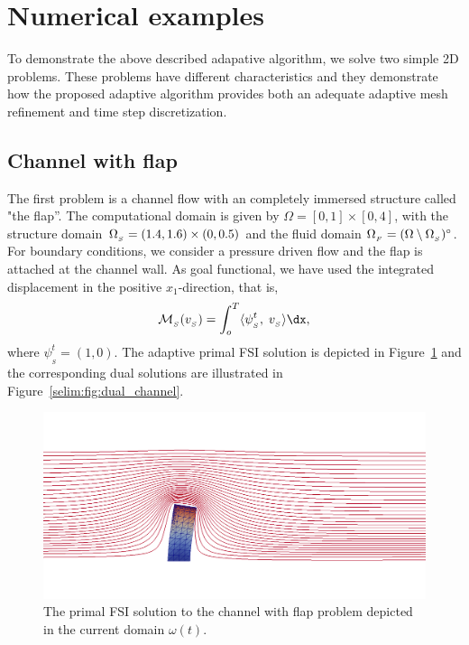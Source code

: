 \section{Numerical examples}

To demonstrate the above described adapative algorithm, we solve two
simple 2D problems. These problems have different characteristics and
they demonstrate how the proposed adaptive algorithm provides both
an adequate adaptive mesh refinement and time step discretization. 

\subsection{Channel with flap}

The first problem is a channel flow with an completely immersed
structure called "the flap''. The computational domain is given by
$\Omega = [0, 1]\times [0,4]$, with the structure domain $\Omega_{_{S}} = (1.4,
1.6)\times (0, 0.5)$ and the fluid domain $\Omega_{_{F}} = (\Omega\setminus
\Omega_{_{S}})^{\circ}$. For boundary conditions, we consider a pressure driven
flow and the flap is attached at the channel wall. As goal functional,
we have used the integrated displacement in the positive
$x_1$-direction, that is,
\begin{equation}
\label{selim:eq:goalfunctional_channel}
\M_{_{S}}(v_{_{S}}) = \int_o^T \langle \psi^t_{_{S}},\;
v_{_{S}}\rangle \dx,
\end{equation}
where $\psi^t_{_{S}} = (1,0)$. The adaptive primal FSI solution is
depicted in Figure~\ref{selim:fig:primal_channel} and the
corresponding dual solutions are illustrated in
Figure~\ref{selim:fig:dual_channel}.
\begin{figure}
  \label{selim:fig:primal_channel}
  \caption{The primal FSI solution to the channel with flap problem
    depicted in the current domain $\omega(t)$.}
  \includegraphics[width=1.0\textwidth]{chapters/selim/png/channel.png}
\end{figure}


